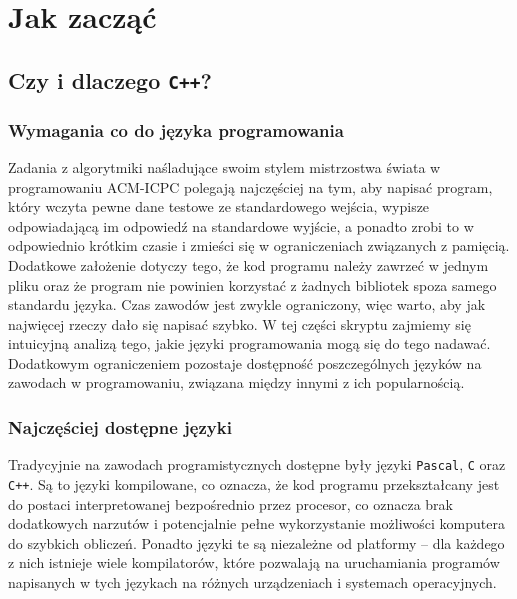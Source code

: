 \chapter{Jak zacząć}

\section{Czy i dlaczego \texttt{C++}?}\label{sec:whycpp}

\subsection{Wymagania co do języka programowania}\label{subsec:whatdoweneed}
Zadania z algorytmiki naśladujące swoim stylem mistrzostwa świata
w programowaniu ACM-ICPC polegają najczęściej na tym, aby napisać program,
który wczyta pewne dane testowe ze standardowego wejścia, wypisze odpowiadającą
im odpowiedź na standardowe wyjście, a ponadto zrobi to w odpowiednio krótkim
czasie i zmieści się w ograniczeniach związanych z pamięcią. Dodatkowe założenie
dotyczy tego, że kod programu należy zawrzeć w jednym pliku oraz że program nie
powinien korzystać z żadnych bibliotek spoza samego standardu języka. Czas
zawodów jest zwykle ograniczony, więc warto, aby jak najwięcej rzeczy dało się
napisać szybko. W tej części skryptu zajmiemy się intuicyjną analizą tego, jakie
języki programowania mogą się do tego nadawać. Dodatkowym ograniczeniem
pozostaje dostępność poszczególnych języków na zawodach w programowaniu,
związana między innymi z ich popularnością.

\subsection{Najczęściej dostępne języki}
Tradycyjnie na zawodach programistycznych dostępne były języki \texttt{Pascal},
\texttt{C} oraz \texttt{C++}. Są to języki kompilowane, co oznacza, że kod
programu przekształcany jest do postaci interpretowanej bezpośrednio przez
procesor, co oznacza brak dodatkowych narzutów i potencjalnie pełne
wykorzystanie możliwości komputera do szybkich obliczeń. Ponadto języki te są
niezależne od platformy -- dla każdego z nich istnieje wiele kompilatorów,
które pozwalają na uruchamiania programów napisanych w tych językach na różnych
urządzeniach i systemach operacyjnych.

